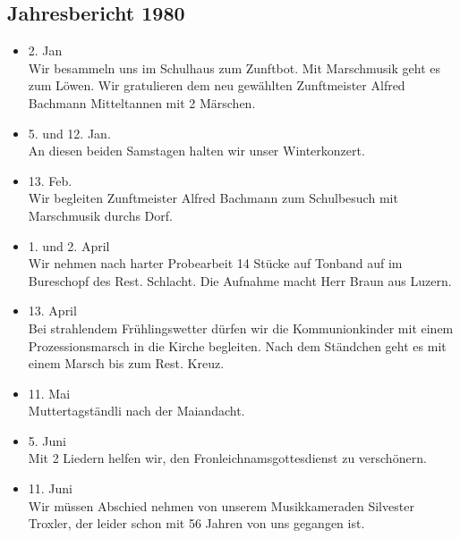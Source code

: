 \subsection{Jahresbericht 1980}

\begin{history}

    \begin{itemize}

        \item[]2. Jan\\
        Wir besammeln uns im Schulhaus zum Zunftbot. Mit Marschmusik geht es zum
        Löwen. Wir gratulieren dem neu gewählten Zunftmeister Alfred Bachmann
        Mitteltannen mit 2 Märschen.

        \item[]5. und 12. Jan.\\
        An diesen beiden Samstagen halten wir unser Winterkonzert.

        \item[]13. Feb.\\
        Wir begleiten Zunftmeister Alfred Bachmann zum Schulbesuch mit
        Marschmusik durchs Dorf.

        \item[]1. und 2. April\\
        Wir nehmen nach harter Probearbeit 14 Stücke auf Tonband auf im
        Bureschopf des Rest. Schlacht. Die Aufnahme macht Herr Braun aus Luzern.

        \item[]13. April\\
        Bei strahlendem Frühlingswetter dürfen wir die Kommunionkinder mit einem
        Prozessionsmarsch in die Kirche begleiten. Nach dem Ständchen geht es
        mit einem Marsch bis zum Rest. Kreuz.

        \item[]11. Mai\\
        Muttertagständli nach der Maiandacht.

        \item[]5. Juni\\
        Mit 2 Liedern helfen wir, den Fronleichnamsgottesdienst zu verschönern.

        \item[]11. Juni\\
        Wir müssen Abschied nehmen von unserem Musikkameraden Silvester Troxler,
        der leider schon mit 56 Jahren von uns gegangen ist.


\end{itemize}
\end{history}
